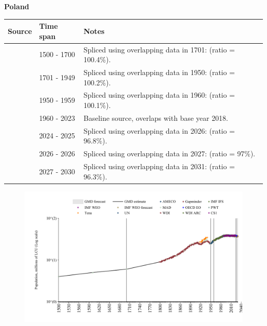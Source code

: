 \documentclass[12pt,a4paper,landscape]{article}
\begin{document}
\begin{adjustbox}{max totalsize={\paperwidth}{\paperheight},center}
\begin{minipage}[t][\textheight][t]{\textwidth}
\vspace*{0.5cm}
{}
\begin{center}
{\Large\bfseries Poland}
\end{center}
\vspace{0.5cm}
\begin{table}[H]
\centering
\small
\begin{tabular}{|l|l|l|}
\hline
\textbf{Source} & \textbf{Time span} & \textbf{Notes} \\
\hline
\rowcolor{white}\cite{MAD}& 1500 - 1700 &Spliced using overlapping data in 1701: (ratio = 100.4\%).\\
\rowcolor{lightgray}\cite{Gapminder}& 1701 - 1949 &Spliced using overlapping data in 1950: (ratio = 100.2\%).\\
\rowcolor{white}\cite{IMF_IFS}& 1950 - 1959 &Spliced using overlapping data in 1960: (ratio = 100.1\%).\\
\rowcolor{lightgray}\cite{WDI}& 1960 - 2023 &Baseline source, overlaps with base year 2018.\\
\rowcolor{white}\cite{OECD_EO}& 2024 - 2025 &Spliced using overlapping data in 2026: (ratio = 96.8\%).\\
\rowcolor{lightgray}\cite{AMECO}& 2026 - 2026 &Spliced using overlapping data in 2027: (ratio = 97\%).\\
\rowcolor{white}\cite{Gapminder}& 2027 - 2030 &Spliced using overlapping data in 2031: (ratio = 96.3\%).\\
\hline
\end{tabular}
\end{table}
\begin{figure}[H]
\centering
\includegraphics[width=\textwidth,height=0.6\textheight,keepaspectratio]{graphs/POL_pop.pdf}
\end{figure}
\end{minipage}
\end{adjustbox}
\end{document}

